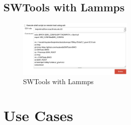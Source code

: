 \documentclass[10pt, conference, compsocconf]{IEEEtran}
\begin{document}
\subsection{SWTools with Lammps}
\begin{figure}[H]
\centering
\includegraphics[width=0.5\textwidth]{swtools-lammps}
\caption{ SWTools with Lammps }
\label{fig:swtools-lammps}
\end{figure}

\section{Use Cases}
\label{sec:results}
\end{document}
